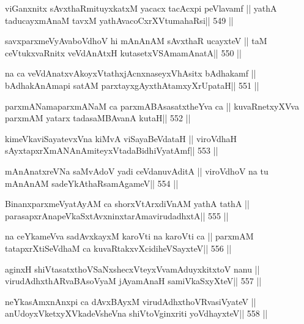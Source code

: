 \begin{shl}
viGanxnitx sAvxthaRmituyxkatxM yacacx tacAcxpi peVlavamf ||
yathA taducayxmAnaM tavxM yathAvacoCxrXVtumahaRsi\hfill || 549 ||
\end{shl}

\begin{shl}
savxparxmeVyAvaboVdhoV hi mAnAnAM sAvxthaR ucayxteV ||
taM ceVtukxvaRnitx veVdAnAtxH kutasetxVSAmamAnatA\hfill || 550 ||
\end{shl}

\begin{shl}
na ca veVdAnatxvAkoyxVtathxjAcnxnaseyxVhAsitx bAdhakamf ||
bAdhakAnAmapi satAM parxtayxgAyxthAtamxyXrUpataH\hfill || 551 ||
\end{shl}

\begin{shl}
parxmANamaparxmANaM ca parxmABAsasatxtheYva ca ||
kuvaRnetxyXVva parxmAM yatarx tadasaMBAvanA kutaH\hfill || 552 ||
\end{shl}

\begin{shl}
kimeVkaviSayatevxVna kiMvA viSayaBeVdataH ||
viroVdhaH sAyxtapxrXmANAnAmiteyxVtadaBidhiVyatAmf\hfill || 553 ||
\end{shl}

\begin{shl}
mAnAnatxreVNa saMvAdoV yadi ceVdanuvAditA ||
viroVdhoV na tu mAnAnAM sadeYkAthaRsamAgameV\hfill || 554 ||
\end{shl}

\begin{shl}
BinanxparxmeVyatAyAM ca shorxVtArxdiVnAM yathA tathA ||
parasapxrAnapeVkaSxtAvxninxtarAmavirudadhxtA\hfill || 555 ||
\end{shl}

\begin{shl}
na ceYkameVva sadAvxkayxM karoVti na karoVti ca ||
parxmAM tatapxrXtiSeVdhaM ca kuvaRtakxvXcidiheVSayxteV\hfill || 556 ||
\end{shl}

\begin{shl}
aginxH shiVtasatxthoVSaNxshecxVteyxVvamAduyxkitxtoV nanu ||
virudAdhxthARvaBAsoV\s yaM jAyamAnaH samiVkaSxyXteV\hfill || 557 ||
\end{shl}

\begin{shl}
neYkasAmxnAnxpi ca dAvxBAyxM virudAdhxthoVR\s vasiVyateV ||
anUdoyxVketxyXVkadeVsheVna shiVtoV\s ginxriti yoVdhayxteV\hfill || 558 ||
\end{shl}

